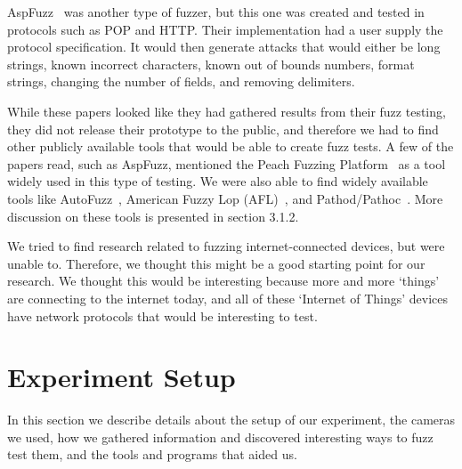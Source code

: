 \documentclass[letterpaper,twocolumn,10pt]{article}
\begin{document}
AspFuzz~\cite{aspfuzz} was another type of fuzzer, but this one was created and tested in protocols such as POP and HTTP. Their implementation had a user supply the protocol specification. It would then generate attacks that would either be long strings, known incorrect characters, known out of bounds numbers, format strings, changing the number of fields, and removing delimiters. 

While these papers looked like they had gathered results from their fuzz testing, they did not release their prototype to the public, and therefore we had to find other publicly available tools that would be able to create fuzz tests. A few of the papers read, such as AspFuzz, mentioned the Peach Fuzzing Platform~\cite{peach} as a tool widely used in this type of testing. We were also able to find widely available tools like AutoFuzz~\cite{autofuzz}, American Fuzzy Lop (AFL)~\cite{afl}, and Pathod/Pathoc~\cite{pathod}. More discussion on these tools is presented in section 3.1.2.

We tried to find research related to fuzzing internet-connected devices, but were unable to. Therefore, we thought this might be a good starting point for our research. We thought this would be interesting because more and more `things' are connecting to the internet today, and all of these `Internet of Things' devices have network protocols that would be interesting to test. 

\section{Experiment Setup}
In this section we describe details about the setup of our experiment, the
cameras we used, how we gathered information and discovered interesting ways to fuzz test them, and the tools and programs that aided us.  
\end{document}
